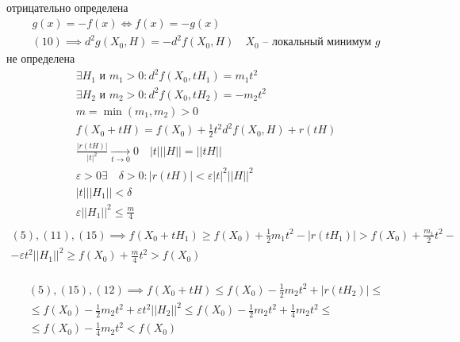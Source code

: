 \documentclass[main]{subfiles}
\begin{document}
\begin{longProof}
        отрицательно определена 
        \begin{gather*}
            g(x) = -f(x) \Leftrightarrow f(x) = - g(x) \\
            (10) \implies d^2g(X_0,H) = -d^2f(X_0,H) \quad X_0 \text{  -- локальный минимум } g \tag{10\prime}
        \end{gather*}
        не определена
        \begin{gather*}
            \exists H_1 \text{ и } m_1 > 0 : d^2f(X_0,tH_1) = m_1t^2 \tag{11}\\
            \exists H_2 \text{ и } m_2 > 0: d^2f(X_0,tH_2) = -m_2t^2 \tag{12} \\
            m = \min(m_1, m_2) > 0 \\
            f(X_0 + tH) = f(X_0) + \frac{1}{2} t^2 d^2f(X_0,H) + r(tH) \tag{13}\\
            \frac{|r(tH)|}{|t|^2} \underset{t \to 0}{\rightarrow} 0 \quad |t|||H|| = ||tH|| \tag{14} \\
            \varepsilon > 0 \exists \quad  \delta > 0 : |r(tH)| < \varepsilon|t|^2||H||^2 \tag{15} \\
            |t|||H_1|| < \delta \\
            \varepsilon||H_1||^2 \leq \frac{m}{4} \tag{17} \\
        \end{gather*}
        \begin{multline*}
            (5), (11), (15) \implies f(X_0 + tH_1) \geq f(X_0) + \frac{1}{2} m_1t^2 - |r(tH_1)| > f(X_0) + \frac{m_1}{2}t^2 - \\
            - \varepsilon t^2||H_1||^2 \geq f(X_0) + \frac{m}{4}t^2 > f(X_0)  \tag{16} \\
        \end{multline*}

        \begin{multline*}
            (5), (15), (12) \implies f(X_0 + tH) \leq f(X_0) - \frac{1}{2} m_2t^2 + |r(tH_2)| \leq \\
            \leq f(X_0) - \frac{1}{2} m_2t^2 + \varepsilon t^2||H_2||^2 \leq f(X_0) - \frac{1}{2}m_2t^2 + \frac{1}{4}m_2t^2 \leq \\
            \leq f(X_0) - \frac{1}{4}m_2t^2 < f(X_0) \tag{18}
        \end{multline*}
\end{longProof}
\end{document}
